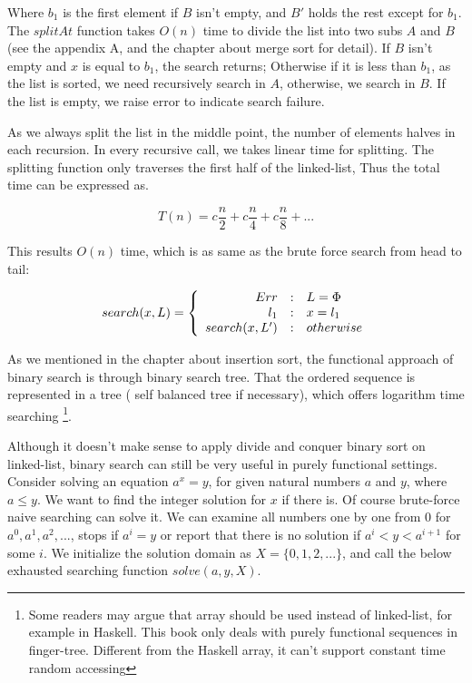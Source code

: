 \documentclass[UTF8]{article}
\begin{document}
Where $b_1$ is the first element if $B$ isn't empty, and $B'$ holds the rest
except for $b_1$.
The $splitAt$ function takes $O(n)$ time to divide the list into two subs $A$ and $B$
(see the appendix A, and the chapter about merge sort for detail).
If $B$ isn't empty and $x$ is equal to $b_1$, the search returns; Otherwise if it is less than $b_1$, as
the list is sorted, we need recursively search in $A$, otherwise, we search in $B$.
If the list is empty, we raise error to indicate search failure.

As we always split the list in the middle point, the number of elements halves in each
recursion. In every recursive call, we takes linear time for splitting. The splitting
function only traverses the first half of the linked-list, Thus the
total time can be expressed as.

\[
T(n) = c \frac{n}{2} + c \frac{n}{4} + c \frac{n}{8} + ...
\]

This results $O(n)$ time, which is as same as the brute force search from head to tail:

\[
search(x, L) = \left \{
  \begin{array}
  {r@{\quad:\quad}l}
  Err & L = \Phi \\
  l_1 & x = l_1 \\
  search(x, L') & otherwise
  \end{array}
\right.
\]

As we mentioned in the chapter about insertion sort, the functional approach of binary search
is through binary search tree. That the ordered sequence is represented in a tree (
self balanced tree if necessary), which offers logarithm time searching \footnote{Some readers
may argue that array should be used instead of linked-list, for example in Haskell. This book
only deals with purely functional sequences in finger-tree. Different from the
Haskell array, it can't support constant time random accessing}.

Although it doesn't make sense to apply divide and conquer binary sort on linked-list, binary
search can still be very useful in purely functional settings. Consider solving an equation
$a^x = y$, for given natural numbers $a$ and $y$, where $a \leq y$. We want to find the
integer solution for $x$ if there is. Of course brute-force naive searching can solve it.
We can examine all numbers one by one from 0 for $a^0, a^1, a^2, ...$, stops if
$a^i = y$ or report that there is no solution if $a^i < y < a^{i+1}$ for some $i$.
We initialize the solution domain as $X = \{0, 1, 2, ...\}$, and call the below
exhausted searching function $solve(a, y, X)$.
\end{document}
